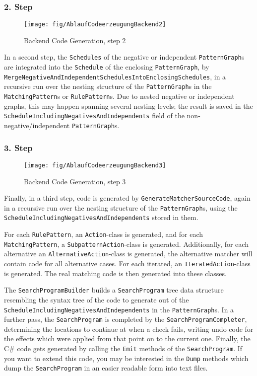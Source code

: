 \subsubsection*{2. Step}

\begin{figure}[htbp]
  \centering
  \texttt{[image: fig/AblaufCodeerzeugungBackend2]}
  \caption{Backend Code Generation, step 2}
  \label{figbackendcodegen2}
\end{figure}

In a second step, the \texttt{Schedules} of the negative or independent \texttt{Pattern\-Graph}s are integrated into the \texttt{Schedule} of the enclosing \texttt{Pattern\-Graph}, by \texttt{Merge\-Negative\-And\-Independent\-Schedules\-Into\-Enclosing\-Schedules}, in a recursive run over the nesting structure of the \texttt{Pattern\-Graph}s in the \texttt{Matching\-Pattern}s or \texttt{Rule\-Pattern}s.
Due to nested negative or independent graphs, this may happen spanning several nesting levels;
the result is saved in the \texttt{Schedule\-Including\-Negatives\-And\-Independents} field of the non-negative/independent \texttt{Pattern\-Graph}s.


\subsubsection*{3. Step}

\begin{figure}[htbp]
  \centering
  \texttt{[image: fig/AblaufCodeerzeugungBackend3]}
  \caption{Backend Code Generation, step 3}
  \label{figbackendcodegen3}
\end{figure}

Finally, in a third step, code is generated by \texttt{Generate\-Matcher\-Source\-Code},
again in a recursive run over the nesting structure of the \texttt{Pattern\-Graph}s, 
using the \texttt{Schedule\-Including\-Negatives\-And\-Independents} stored in them. 

For each \texttt{Rule\-Pattern}, an \texttt{Action}-class is generated, 
and for each \texttt{Matching\-Pattern}, a \texttt{Subpattern\-Action}-class is generated.
Additionally, for each alternative an \texttt{Alternative\-Action}-class is generated,
the alternative matcher will contain code for all alternative cases.
For each iterated, an \texttt{Iterated\-Action}-class is generated.
The real matching code is then generated into these classes.

The \texttt{SearchProgramBuilder} builds a \texttt{SearchProgram} tree data structure resembling the syntax tree of the code to generate out of the \texttt{Schedule\-Including\-Negatives\-And\-Independents} in the \texttt{Pattern\-Graph}s. 
In a further pass, the \texttt{SearchProgram} is completed by the \texttt{Search\-Program\-Completer},
determining the locations to continue at when a check fails,
writing undo code for the effects which were applied from that point on to the current one.
Finally, the C\# code gets generated by calling the \texttt{Emit} methods of the \texttt{SearchProgram}.
If you want to extend this code, you may be interested in the \texttt{Dump} methods which dump the \texttt{SearchProgram} in an easier readable form into text files.

